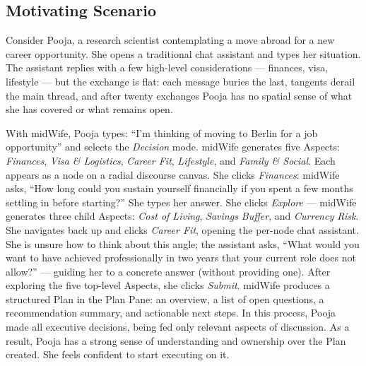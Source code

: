 \documentclass[sigconf]{acmart}
\begin{document}
\subsection{Motivating Scenario}

Consider Pooja, a research scientist contemplating a move abroad for a new career
opportunity. She opens a traditional chat assistant and types her situation. The
assistant replies with a few high-level considerations --- finances, visa, lifestyle
--- but the exchange is flat: each message buries the last, tangents derail the main
thread, and after twenty exchanges Pooja has no spatial sense of what she has covered
or what remains open.

With midWife, Pooja types: ``I'm thinking of moving to Berlin for a job opportunity''
and selects the \textit{Decision} mode. midWife generates five Aspects: \textit{Finances},
\textit{Visa \& Logistics}, \textit{Career Fit}, \textit{Lifestyle}, and
\textit{Family \& Social}. Each appears as a node on a radial discourse canvas. She
clicks \textit{Finances}: midWife asks, ``How long could you sustain yourself financially
if you spent a few months settling in before starting?'' She types her answer. She clicks
\textit{Explore} --- midWife generates three child Aspects: \textit{Cost of Living},
\textit{Savings Buffer}, and \textit{Currency Risk}. She navigates back up and clicks
\textit{Career Fit}, opening the per-node chat assistant. She is unsure how to think
about this angle; the assistant asks, ``What would you want to have achieved professionally
in two years that your current role does not allow?'' --- guiding her to a concrete answer
(without providing one). After exploring the five top-level Aspects, she clicks
\textit{Submit}. midWife produces a structured Plan in the Plan Pane: an overview, a list
of open questions, a recommendation summary, and actionable next steps. In this process, 
Pooja made all executive decisions, being fed only relevant aspects of discussion. As a result,
Pooja has a strong sense of understanding and ownership over the Plan created. She feels confident
to start executing on it.

\end{document}
